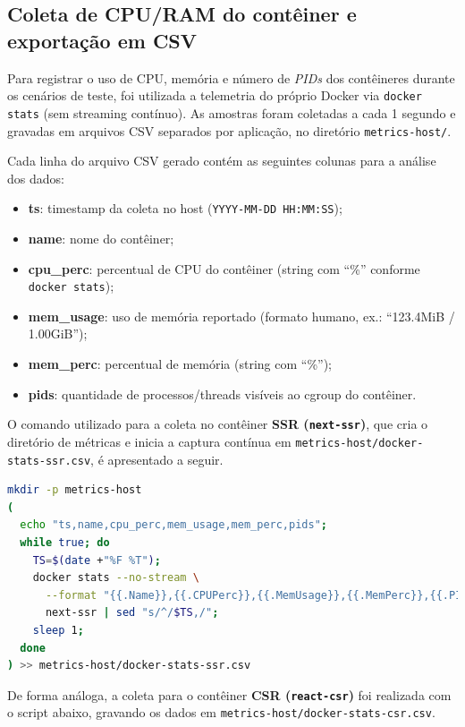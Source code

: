 \subsection{Coleta de CPU/RAM do contêiner e exportação em CSV}
\label{ssec:coleta-host-docker-stats}

Para registrar o uso de CPU, memória e número de \textit{PIDs} dos contêineres durante os cenários de teste, foi utilizada a telemetria do próprio Docker via \texttt{docker stats} (sem streaming contínuo). As amostras foram coletadas a cada 1 segundo e gravadas em arquivos CSV separados por aplicação, no diretório \texttt{metrics-host/}.

Cada linha do arquivo CSV gerado contém as seguintes colunas para a análise dos dados:
\begin{itemize}
  \item \textbf{ts}: timestamp da coleta no host (\texttt{YYYY-MM-DD HH:MM:SS});
  \item \textbf{name}: nome do contêiner;
  \item \textbf{cpu\_perc}: percentual de CPU do contêiner (string com ``\%'' conforme \texttt{docker stats});
  \item \textbf{mem\_usage}: uso de memória reportado (formato humano, ex.: ``123.4MiB / 1.00GiB'');
  \item \textbf{mem\_perc}: percentual de memória (string com ``\%'');
  \item \textbf{pids}: quantidade de processos/threads visíveis ao cgroup do contêiner.
\end{itemize}

O comando utilizado para a coleta no contêiner \textbf{SSR (\texttt{next-ssr})}, que cria o diretório de métricas e inicia a captura contínua em \texttt{metrics-host/docker-stats-ssr.csv}, é apresentado a seguir.

\begin{lstlisting}[language=bash,caption={Captura de CPU/RAM do contêiner SSR e exportação para CSV}]
mkdir -p metrics-host
(
  echo "ts,name,cpu_perc,mem_usage,mem_perc,pids";
  while true; do
    TS=$(date +"%F %T");
    docker stats --no-stream \
      --format "{{.Name}},{{.CPUPerc}},{{.MemUsage}},{{.MemPerc}},{{.PIDs}}" \
      next-ssr | sed "s/^/$TS,/";
    sleep 1;
  done
) >> metrics-host/docker-stats-ssr.csv
\end{lstlisting}

De forma análoga, a coleta para o contêiner \textbf{CSR (\texttt{react-csr})} foi realizada com o script abaixo, gravando os dados em \texttt{metrics-host/docker-stats-csr.csv}.


